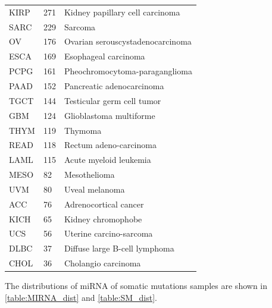 \begin{table} [!ht]
\begin{center}
\begin{tabular}{l|l|l}
         KIRP & 271  & Kidney papillary cell carcinoma	\\%
         SARC & 229  & Sarcoma \\%
         OV   & 176  & Ovarian serouscystadenocarcinoma \\%
         ESCA & 169  & Esophageal carcinoma \\%
         PCPG & 161  & Pheochromocytoma-paraganglioma \\%
         PAAD & 152  & Pancreatic adenocarcinoma	\\%
         TGCT & 144  & Testicular germ cell tumor \\%
         GBM  & 124  & Glioblastoma multiforme \\%
         THYM & 119  & Thymoma	 \\%
         READ & 118  & Rectum adeno-carcinoma \\%
         LAML & 115  & Acute myeloid leukemia	\\%
         MESO & 82  & Mesothelioma	\\%
         UVM & 80  & Uveal melanoma	 \\%
         ACC & 76  & Adrenocortical cancer	\\%
         KICH & 65  & Kidney chromophobe	\\%
         UCS & 56  & Uterine carcino-sarcoma	 \\%
         DLBC & 37  & Diffuse large B-cell lymphoma	\\%
         CHOL & 36  & Cholangio carcinoma	 \\%
         \bottomrule
    \end{tabular}
    \end{center}
\end{table}
The distributions of miRNA of somatic mutations samples are shown in \cref{table:MIRNA_dist} and \cref{table:SM_dist}. 
